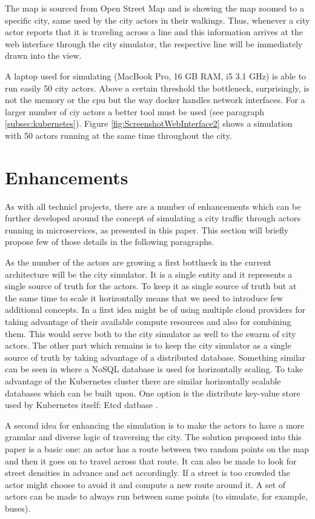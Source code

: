 \documentclass[conference]{IEEEtran}
\begin{document}
The map is sourced from Open Street Map \citep{openstreetmap} and is showing the map zoomed to a specific city, same used by the city actors in their walkings. Thus, whenever a city actor reports that it is traveling across a line and this information arrives at the web interface through the city simulator, the respective line will be immediately drawn into the view.

A laptop used for simulating (MacBook Pro, 16 GB RAM, i5 3.1 GHz) is able to run easily 50 city actors. Above a certain threshold the bottleneck, surprisingly, is not the memory or the cpu but the way docker handles network interfaces. For a larger number of ciy actors a better tool must be used (see paragraph \ref{subsec:kubernetes}). Figure \ref{fig:ScreenshotWebInterface2} shows a simulation with 50 actors running at the same time throughout the city.

\section{Enhancements}
\label{sec:enhancements}

As with all technicl projects, there are a number of enhancements which can be further developed around the concept of simulating a city traffic through actors running in microservices, as presented in this paper. This section will briefly propose few of those details in the following paragraphs.

As the number of the actors are growing a first bottlneck in the current architecture will be the city simulator. It is a single entity and it represents a single source of truth for the actors. To keep it as single source of truth but at the same time to scale it horizontally means that we need to introduce few additional concepts. In \cite{6847479} a first idea might be of using multiple cloud providers for taking advantage of their available compute resources and also for combining them. This would serve both to the city simulator as well to the swarm of city actors. The other part which remains is to keep the city simulator as a single source of truth by taking advantage of a distributed database. Something similar can be seen in \cite{8509417} where a NoSQL database is used for horizontally scaling. To take advantage of the Kubernetes cluster there are similar horizontally scalable databases which can be built upon. One option is the distribute key-value store used by Kubernetes itself: Etcd datbase \citep{etcd}.

A second idea for enhancing the simulation is to make the actors to have a more granular and diverse logic of traversing the city. The solution proposed into this paper is a basic one: an actor has a route between two random points on the map and then it goes on to travel across that route. It can also be made to look for street densities in advance and act accordingly. If a street is too crowded the actor might choose to avoid it and compute a new route around it. A set of actors can be made to always run between same points (to simulate, for example, buses).
\end{document}
